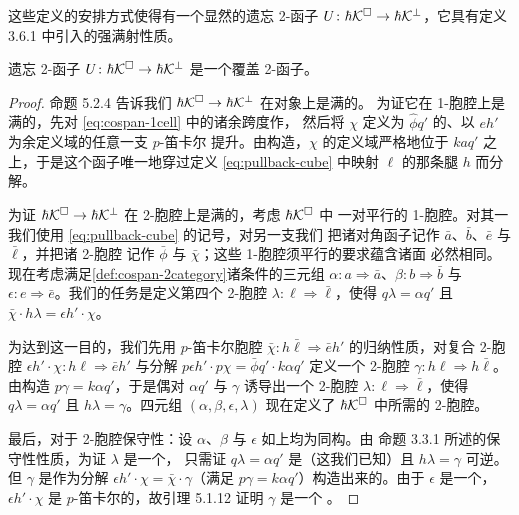 这些定义的安排方式使得有一个显然的遗忘 2-函子
$U\colon\hbar\mathcal{K}^{\square}\to\hbar\mathcal{K}^{\perp}$，它具有定义 3.6.1 中引入的强满射性质。

\begin{lemma}\label{lem:smothering-forgetful}
遗忘 2-函子 $U\colon\hbar\mathcal{K}^{\square}\to\hbar\mathcal{K}^{\perp}$ 是一个覆盖 2-函子。
\end{lemma}

\begin{proof}
命题 5.2.4 告诉我们 $\hbar\mathcal{K}^{\square}\to\hbar\mathcal{K}^{\perp}$ 在对象上是满的。
为证它在 1-胞腔上是满的，先对 \eqref{eq:cospan-1cell} 中的诸余跨度作\trPullback，
然后将 $\chi$ 定义为 $\hat{\phi}q'$ 的、以 $eh'$ 为余定义域的任意一支 $p$-笛卡尔
提升。由构造，$\chi$ 的定义域严格地位于 $kaq'$ 之上，于是这个函子唯一地穿过定义
\eqref{eq:pullback-cube} 中映射 $\ell$ 的那条\trPullback{}腿 $h$ 而分解。

为证 $\hbar\mathcal{K}^{\square}\to\hbar\mathcal{K}^{\perp}$ 在 2-胞腔上是满的，考虑 $\hbar\mathcal{K}^{\square}$ 中
一对平行的 1-胞腔。对其一我们使用 \eqref{eq:pullback-cube} 的记号，对另一支我们
把诸对角函子记作 $\bar{a}$、$\bar{b}$、$\bar{e}$ 与 $\bar{\ell}$，并把诸 2-胞腔
记作 $\bar{\phi}$ 与 $\bar{\chi}$；这些 1-胞腔须平行的要求蕴含诸\trPullback{}面
必然相同。现在考虑满足\cref{def:cospan-2category}诸条件的三元组
$\alpha\colon a\Rightarrow\bar{a}$、$\beta\colon b\Rightarrow\bar{b}$ 与
$\epsilon\colon e\Rightarrow\bar{e}$。我们的任务是定义第四个 2-胞腔
$\lambda\colon\ell\Rightarrow\bar{\ell}$，使得 $q\lambda=\alpha q'$ 且
$\bar{\chi}\cdot h\lambda=\epsilon h'\cdot\chi$。

为达到这一目的，我们先用 $p$-笛卡尔胞腔
$\bar{\chi}\colon h\bar{\ell}\Rightarrow\bar{e}h'$ 的归纳性质，对复合 2-胞腔
$\epsilon h'\cdot\chi\colon h\ell\Rightarrow\bar{e}h'$ 与分解
$p\epsilon h'\cdot p\chi=\bar{\phi}q'\cdot k\alpha q'$ 定义一个 2-胞腔
$\gamma\colon h\ell\Rightarrow h\bar{\ell}$。
由构造 $p\gamma=k\alpha q'$，于是偶对 $\alpha q'$ 与 $\gamma$ 诱导出一个 2-胞腔
$\lambda\colon\ell\Rightarrow\bar{\ell}$，使得 $q\lambda=\alpha q'$ 且
$h\lambda=\gamma$。四元组 $(\alpha,\beta,\epsilon,\lambda)$ 现在定义了
$\hbar\mathcal{K}^{\square}$ 中所需的 2-胞腔。

最后，对于 2-胞腔保守性：设 $\alpha$、$\beta$ 与 $\epsilon$ 如上均为同构。由
命题 3.3.1 所述\trPullback{}的保守性性质，为证 $\lambda$ 是一个\trIsomorphism，
只需证 $q\lambda=\alpha q'$ 是（这我们已知）且 $h\lambda=\gamma$ 可逆。
但 $\gamma$ 是作为分解 $\epsilon h'\cdot\chi=\bar{\chi}\cdot\gamma$（满足
$p\gamma=k\alpha q'$）构造出来的。由于 $\epsilon$ 是一个\trIsomorphism，
$\epsilon h'\cdot\chi$ 是 $p$-笛卡尔的，故引理 5.1.12 证明 $\gamma$ 是一个%
\trIsomorphism。
\end{proof}

